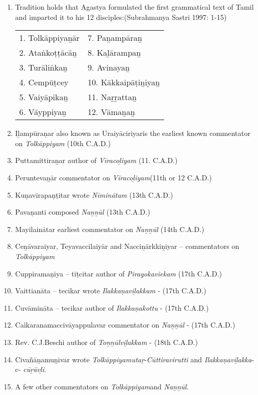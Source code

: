 \begin{enumerate}[{\rm 1)}]
\itemsep=0pt
\item Tradition holds that Agastya formulated the first grammatical text of Tamil and imparted it to his 12 disciples:(Subrahmanya Sastri 1997: 1-15)

\begin{longtable}{ll}
1. Tolkāppiyaṉār & 7. Paṉampāraṉ \\
2. Ataṅkoṭṭācāṉ & 8. Kaḻārampaṉ \\
3. Turāliṅkaṉ & 9. Avinayaṉ \\
4. Cempūṭcey & 10. Kākkaipāṭiṉiyaṉ \\
5. Vaiyāpikaṉ & 11. Naṟṟattaṉ \\
6. Vāyppiyaṉ & 12. Vāmaṉaṉ 
\end{longtable}

 \item Iḻampūraṇar also known as Uraiyāciriyaris the earliest known commentator on \textit{Tolkāppiyam} (10th C.A.D.)

 \item Puttamittiraṉar author of \textit{Vīracoḻiyam} (11. C.A.D.)

 \item Peruntevaṉār commentator on \textit{Vīracoḻiyam}(11th or 12 C.A.D.)

 \item Kuṇavīrapaṇṭitar wrote \textit{Nīminātam} (13th C.A.D.)

 \item Pavaṇanti composed \textit{Naṉṉūl} (13th C.A.D.)

 \item Mayilainātar earliest commentator on \textit{Naṉṉūl} (14th C.A.D.)

 \item Ceṉāvaraiyar, Teyavaccilaiyār and Nacciṉārkkiṉiyar – commentators on \textit{Tolkāppiyam}

 \item Cuppiramaṇiya – tīṭcitar author of \textit{Pirayokaviekam} (17th C.A.D.)

 \item Vaittianāta – tecikar wrote \textit{Ilakkaṇaviḻakkam} - (17th C.A.D.)

 \item Cuvāmināta – tecikar author of \textit{Ilakkaṇakottu} - (17th C.A.D.)

 \item Caìkaranamaccivāyappulavar commentator on \textit{Naṉṉūl} - (17th C.A.D.)

 \item Rev. C.J.Beschi author of \textit{Toṉṉūlviḻakkam} - (18th C.A.D.)

 \item Civañāṉamuṉivar wrote \textit{Tolkāppiyamutaṛ}-\textit{Cūttiravirutti} and \textit{Ilakkaṇa\-viḻakka}- c- \textit{cūṟāvḻi}.

 \item A few other commentators on \textit{Tolkāppiyam}and \textit{Naṉṉūl}.

\end{enumerate}


